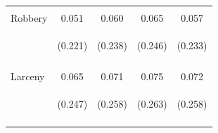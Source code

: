\begin{center}
\begin{tabular}{lcccc}
 & \begin{footnotesize}\end{footnotesize} & \begin{footnotesize}\end{footnotesize} & \begin{footnotesize}\end{footnotesize} & \begin{footnotesize}\end{footnotesize}\\
\noalign{\smallskip}Robbery & 0.051 & 0.060 & 0.065 & 0.057\\
 & \begin{footnotesize}(0.221)\end{footnotesize} & \begin{footnotesize}(0.238)\end{footnotesize} & \begin{footnotesize}(0.246)\end{footnotesize} & \begin{footnotesize}(0.233)\end{footnotesize}\\
 & \begin{footnotesize}\end{footnotesize} & \begin{footnotesize}\end{footnotesize} & \begin{footnotesize}\end{footnotesize} & \begin{footnotesize}\end{footnotesize}\\
\noalign{\smallskip}Larceny & 0.065 & 0.071 & 0.075 & 0.072\\
 & \begin{footnotesize}(0.247)\end{footnotesize} & \begin{footnotesize}(0.258)\end{footnotesize} & \begin{footnotesize}(0.263)\end{footnotesize} & \begin{footnotesize}(0.258)\end{footnotesize}\\
 & \begin{footnotesize}\end{footnotesize} & \begin{footnotesize}\end{footnotesize} & \begin{footnotesize}\end{footnotesize} & \begin{footnotesize}\end{footnotesize}\\

\end{tabular}
\end{center}
